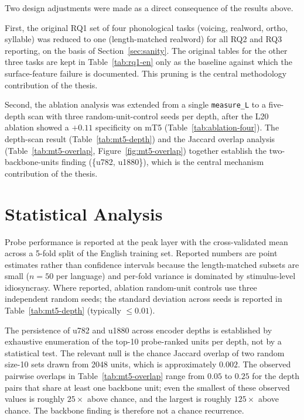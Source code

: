 Two design adjustments were made as a direct consequence of the results above.

First, the original RQ1 set of four phonological tasks (voicing, realword, ortho, syllable) was reduced to one (length-matched realword) for all RQ2 and RQ3 reporting, on the basis of Section~\ref{sec:sanity}. The original tables for the other three tasks are kept in Table~\ref{tab:rq1-en} only as the baseline against which the surface-feature failure is documented. This pruning is the central methodology contribution of the thesis.

Second, the ablation analysis was extended from a single \texttt{measure\_L} to a five-depth scan with three random-unit-control seeds per depth, after the L20 ablation showed a $+0.11$ specificity on mT5 (Table~\ref{tab:ablation-four}). The depth-scan result (Table~\ref{tab:mt5-depth}) and the Jaccard overlap analysis (Table~\ref{tab:mt5-overlap}, Figure~\ref{fig:mt5-overlap}) together establish the two-backbone-units finding (\{u782, u1880\}), which is the central mechanism contribution of the thesis.

\section{Statistical Analysis}
\label{sec:stats}

Probe performance is reported at the peak layer with the cross-validated mean across a 5-fold split of the English training set. Reported numbers are point estimates rather than confidence intervals because the length-matched subsets are small ($n = 50$ per language) and per-fold variance is dominated by stimulus-level idiosyncrasy. Where reported, ablation random-unit controls use three independent random seeds; the standard deviation across seeds is reported in Table~\ref{tab:mt5-depth} (typically $\leq 0.01$).

The persistence of u782 and u1880 across encoder depths is established by exhaustive enumeration of the top-10 probe-ranked units per depth, not by a statistical test. The relevant null is the chance Jaccard overlap of two random size-10 sets drawn from 2048 units, which is approximately $0.002$. The observed pairwise overlaps in Table~\ref{tab:mt5-overlap} range from $0.05$ to $0.25$ for the depth pairs that share at least one backbone unit; even the smallest of these observed values is roughly $25\times$ above chance, and the largest is roughly $125\times$ above chance. The backbone finding is therefore not a chance recurrence.

